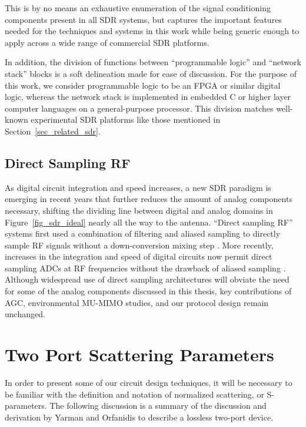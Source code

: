 	This is by no means an exhaustive enumeration of the signal conditioning components present in all \ac{SDR} systems, but captures the important features needed for the techniques and systems in this work while being generic enough to apply across a wide range of commercial \ac{SDR} platforms.

	In addition, the division of functions between ``programmable logic'' and ``network stack'' blocks is a soft delineation made for ease of discussion.
	For the purpose of this work, we consider programmable logic to be an \ac{FPGA} or similar digital logic, whereas the network stack is implemented in embedded C or higher layer computer languages on a general-purpose processor.
	This division matches well-known experimental \ac{SDR} platforms like those mentioned in Section~\ref{sec_related_sdr}.

\subsection{Direct Sampling RF}
	As digital circuit integration and speed increases, a new \ac{SDR} paradigm is emerging in recent years that further reduces the amount of analog components necessary, shifting the dividing line between digital and analog domains in Figure~\ref{fig_sdr_ideal} nearly all the way to the antenna.
	``Direct sampling RF'' systems first used a combination of filtering and aliased sampling to directly sample RF signals without a down-conversion mixing step \cite{psiaki2005design}.
	More recently, increases in the integration and speed of digital circuits now permit direct sampling \acp{ADC} at RF frequencies without the drawback of aliased sampling \cite{xilinx2017rfsoc}.
	Although widespread use of direct sampling architectures will obviate the need for some of the analog components discussed in this thesis, key contributions of \ac{AGC}, environmental \ac{MU-MIMO} studies, and our protocol design remain unchanged.

\section{Two Port Scattering Parameters}
\label{sec_scattering}

	In order to present some of our circuit design techniques, it will be necessary to be familiar with the definition and notation of normalized scattering, or S-parameters.
	The following discussion is a summary of the discussion and derivation by Yarman \cite{yarman2010design} and Orfanidis \cite{orfanidis2002electromagnetic} to describe a lossless two-port device.
	
